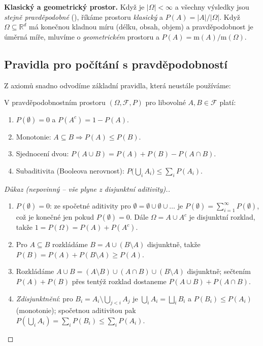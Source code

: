 \documentclass[11pt,a4paper]{article}
\newcommand{\R}{\mathbb{R}}
\begin{document}
\begin{poznamka}
\textbf{Klasický a geometrický prostor.} Když je $|\Omega|<\infty$ a všechny výsledky jsou \emph{stejně pravděpodobné} (), říkáme prostoru \emph{klasický} a $P(A)=|A|/|\Omega|$. Když $\Omega\subseteq\R^d$ má konečnou kladnou míru (délku, obsah, objem) a pravděpodobnost je úměrná míře, mluvíme o \emph{geometrickém} prostoru a $P(A)=\mathrm{m}(A)/\mathrm{m}(\Omega)$.
\end{poznamka}

\subsection{Pravidla pro počítání s pravděpodobností}

Z axiomů snadno odvodíme základní pravidla, která neustále používáme:

\begin{veta}
V pravděpodobnostním prostoru $(\Omega,\mathcal{F},P)$ pro libovolné $A,B\in\mathcal{F}$ platí:
\begin{enumerate}[label=(\arabic*)]
  \item $P(\emptyset)=0$ a $P(A^c)=1-P(A)$.
  \item Monotonie: $A\subseteq B\Rightarrow P(A)\le P(B)$.
  \item Sjednocení dvou: $P(A\cup B)=P(A)+P(B)-P(A\cap B)$.
  \item Subaditivita (Booleova nerovnost): $P\big(\bigcup_i A_i\big)\le\sum_i P(A_i)$.
\end{enumerate}
\end{veta}

\begin{proof}[Důkaz \textnormal{(nepovinný -- vše plyne z disjunktní aditivity).}]\leavevmode
\begin{enumerate}[label=(\arabic*)]
  \item $P(\emptyset)=0$: ze spočetné aditivity pro $\emptyset=\emptyset\cup\emptyset\cup\dots$ je $P(\emptyset)=\sum_{i=1}^\infty P(\emptyset)$, což je konečné jen pokud $P(\emptyset)=0$. Dále $\Omega=A\cup A^c$ je disjunktní rozklad, takže $1=P(\Omega)=P(A)+P(A^c)$.
  \item Pro $A\subseteq B$ rozkládáme $B=A\cup(B\setminus A)$ disjunktně, takže $P(B)=P(A)+P(B\setminus A)\ge P(A)$.
  \item Rozkládáme $A\cup B=(A\setminus B)\cup(A\cap B)\cup(B\setminus A)$ disjunktně; sečtením $P(A)+P(B)$ přes tentýž rozklad dostaneme $P(A\cup B)+P(A\cap B)$.
  \item \emph{Zdisjunktnění}: pro $B_i=A_i\setminus\bigcup_{j<i}A_j$ je $\bigcup_i A_i=\bigsqcup_i B_i$ a $P(B_i)\le P(A_i)$ (monotonie); spočetnou aditivitou pak $P(\bigcup_i A_i)=\sum_i P(B_i)\le\sum_i P(A_i)$.
\end{enumerate}
\end{proof}
\end{document}
